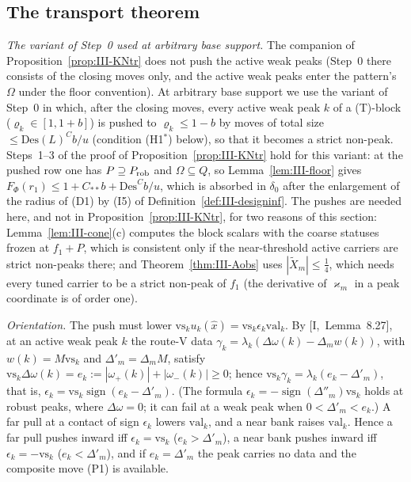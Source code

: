 \documentclass[10pt]{amsart}
\theoremstyle{definition}
\theoremstyle{remark}
\newcommand{\sgn}{\operatorname{sign}}
\begin{document}
\subsection{The transport theorem}\label{subsec:III-transport}

\emph{The variant of Step~0 used at arbitrary base support.}  The
companion of Proposition~\ref{prop:III-KNtr} does not push the active weak
peaks (Step~0 there consists of the closing moves only, and the active weak
peaks enter the pattern's $\Omega$ under the floor convention).  At arbitrary
base support we use the variant of Step~0 in which, after the closing moves,
every active weak peak $k$ of a (T)-block ($\varrho_k\in[1,1+b]$) is pushed
to $\varrho_k\le1-b$ by moves of total size $\le\mathrm{Des}(L)^Cb/u$
(condition (H1$^*$) below), so that it becomes a strict non-peak.  Steps~1--3
of the proof of Proposition~\ref{prop:III-KNtr} hold for this variant: at the
pushed row one has $P\supseteq P_{\rm rob}$ and $\Omega\subseteq Q$, so
Lemma~\ref{lem:III-floor} gives $F_\Phi(r_1)\le1+C_{**}b+\mathrm{Des}^{C}b/u$,
which is absorbed in $\delta_0$ after the enlargement of the radius of (D1)
by (I5) of Definition~\ref{def:III-designinf}.  The pushes are needed here,
and not in Proposition~\ref{prop:III-KNtr}, for two reasons of this section:
Lemma~\ref{lem:III-cone}(c) computes the block scalars with the coarse
statuses frozen at $f_1+P$, which is consistent only if the near-threshold
active carriers are strict non-peaks there; and Theorem~\ref{thm:III-Aobs}
uses $|\tilde X_m|\le\frac14$, which needs every tuned carrier to be a strict
non-peak of $f_1$ (the derivative of $\varkappa_m$ in a peak coordinate is of
order one).

\emph{Orientation.}  The push must lower $\mathrm{vs}_ku_k(\hat x)=
\mathrm{vs}_k\epsilon_k\mathrm{val}_k$.  By [I,~Lemma~8.27], at an active weak
peak $k$ the route-V data $\gamma_k=\lambda_k(\Delta\omega(k)-\Delta_mw(k))$,
with $w(k)=M\mathrm{vs}_k$ and $\Delta'_m=\Delta_mM$, satisfy $\mathrm{vs}_k
\Delta\omega(k)=e_k:=|\omega_+(k)|+|\omega_-(k)|\ge0$; hence
$\mathrm{vs}_k\gamma_k=\lambda_k(e_k-\Delta'_m)$, that is,
$\epsilon_k=\mathrm{vs}_k\sgn(e_k-\Delta'_m)$.  (The formula
$\epsilon_k=-\sgn(\Delta''_m)\mathrm{vs}_k$ holds at robust peaks, where
$\Delta\omega=0$; it can fail at a weak peak when $0<\Delta'_m<e_k$.)  A far
pull at a contact of sign $\epsilon_k$ lowers $\mathrm{val}_k$, and a near
bank raises $\mathrm{val}_k$.  Hence a far pull pushes inward iff
$\epsilon_k=\mathrm{vs}_k$ ($e_k>\Delta'_m$), a near bank pushes inward iff
$\epsilon_k=-\mathrm{vs}_k$ ($e_k<\Delta'_m$), and if $e_k=\Delta'_m$ the peak
carries no data and the composite move (P1) is available.
\end{document}
